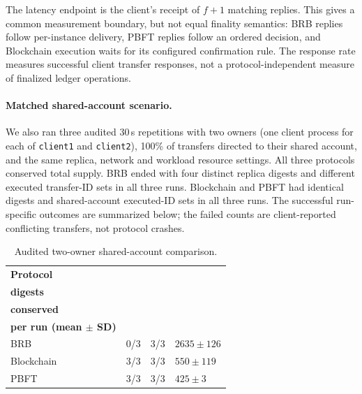 \documentclass[sigconf,a4paper]{acmart}
\begin{document}
    The latency endpoint is the client's receipt of $f+1$ matching replies.
    This gives a common measurement boundary, but not equal finality semantics:
    BRB replies follow per-instance delivery, PBFT replies follow an ordered
    decision, and Blockchain execution waits for its configured confirmation
    rule. The response rate measures successful client transfer responses, not
    a protocol-independent measure of finalized ledger operations.

    \paragraph{Matched shared-account scenario.}
    We also ran three audited 30\,s repetitions with two owners (one client
    process for each of \texttt{client1} and \texttt{client2}), 100\% of
    transfers directed to their shared account, and the same replica, network
    and workload resource settings. All three protocols conserved total
    supply. BRB ended with four distinct replica digests and different executed
    transfer-ID sets in all three runs. Blockchain and PBFT had identical
    digests and shared-account executed-ID sets in all three runs. The
    successful run-specific outcomes are summarized below; the failed counts
    are client-reported conflicting transfers, not protocol crashes.

    \begin{table}[t]
        \centering
        \scriptsize
        \setlength{\tabcolsep}{3pt}
        \caption{Audited two-owner shared-account comparison.}
        \label{tab:cross-protocol-shared}
        \begin{tabular}{p{1.35cm}p{1.35cm}p{1.2cm}p{2.7cm}}
            \toprule
            \textbf{Protocol} & \shortstack{\textbf{Matching}\\\textbf{digests}} & \shortstack{\textbf{Supply}\\\textbf{conserved}} & \shortstack{\textbf{Rejected replies}\\\textbf{per run (mean $\pm$ SD)}} \\
            \midrule
            BRB & 0/3 & 3/3 & $2635\pm126$ \\
            Blockchain & 3/3 & 3/3 & $550\pm119$ \\
            PBFT & 3/3 & 3/3 & $425\pm3$ \\
            \bottomrule
        \end{tabular}
    \end{table}
\end{document}
